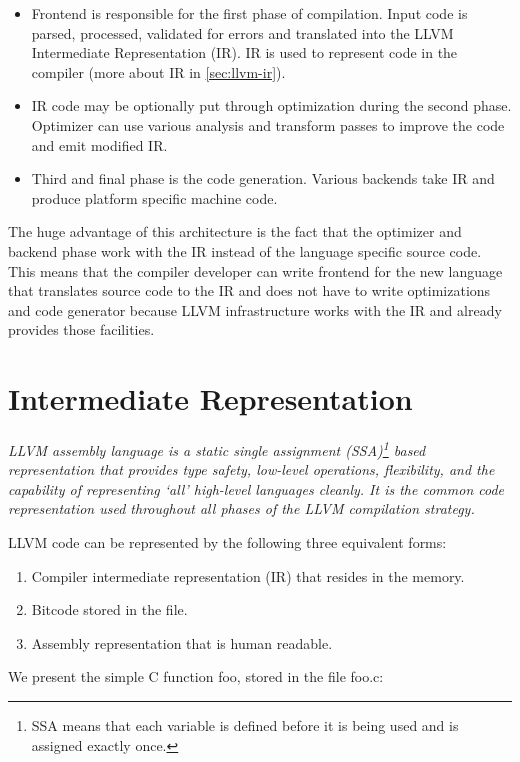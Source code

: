 \documentclass[12pt, twoside]{fithesis2}
\renewcommand{\_}{\leavevmode \kern0.07em\vbox{\hrule width0.4em}}
\newcommand{\squarebullet}{\textcolor{black}{\raisebox{0.15em}{\rule{4pt}{4pt}}}}
\newenvironment{myItemize}{
  \begin{itemize}[
    leftmargin=2em,
    rightmargin=1em,
    itemsep=\parskip,
    parsep=0em,
    topsep=0em,
    partopsep=0em
]
  \renewcommand{\labelitemi}{\squarebullet}
  \renewcommand{\labelitemii}{\textbullet}
}{
  \end{itemize}
}
\newenvironment{myEnumerate}{
  \begin{enumerate}[
    leftmargin=2em,
    rightmargin=1em,
    itemsep=\parskip,
    parsep=0em,
    topsep=0em,
    partopsep=0em
]
}{
  \end{enumerate}
}
\begin{document}
\begin{myItemize}
\item Frontend is responsible for the first phase of compilation. Input code is
parsed, processed, validated for errors and translated into the LLVM Intermediate
Representation (IR). IR is used to represent code in the compiler (more about IR
in \autoref{sec:llvm-ir}).
\item IR code may be optionally put through
optimization during the second phase. Optimizer can use various analysis and transform
passes to improve the code and emit modified IR.
\item Third and final phase is the code generation. Various backends take
IR and produce platform specific machine code.
\end{myItemize}

The huge advantage of this architecture is the fact that the optimizer and
backend phase work with the IR instead of the language specific source code.
This means that the compiler developer can write frontend for the new language
that translates source code to the IR and does not have to write optimizations
and code generator because LLVM infrastructure works with the IR and already
provides those facilities.

\section{Intermediate Representation}
\label{sec:llvm-ir}

\emph{
LLVM assembly language is a static single assignment (SSA)\footnote{
SSA means that each variable is defined before it is being used and is assigned
exactly once.\cite{ssa}
}
based representation that provides type safety, low-level operations,
flexibility, and the capability of representing ‘all’ high-level languages
cleanly. It is the common code representation used throughout all phases of the
LLVM compilation strategy.\cite{llvm-ir}
}

LLVM code can be represented by the following three equivalent forms:
\begin{myEnumerate}
\item Compiler intermediate representation (IR) that resides in the memory.
\item Bitcode stored in the file.
\item Assembly representation that is human readable.
\end{myEnumerate}

\bigskip
\noindent
We present the simple C function foo, stored in the file foo.c:
\end{document}
